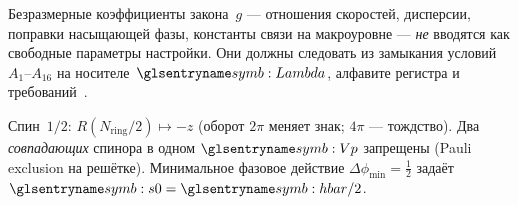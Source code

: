 \begin{axiom}
\label{ax:A15}
Безразмерные коэффициенты закона~$g$ --- отношения скоростей, дисперсии, поправки насыщающей фазы,
константы связи на макроуровне --- \emph{не} вводятся как свободные параметры настройки.
Они должны следовать из замыкания условий $A_1$--$A_{16}$ на носителе~$\carrierLattice$,
алфавите регистра и требований~.
\end{axiom}

\begin{axiom}
\label{ax:A16}
Спин~$1/2$: $R(N_{\mathrm{ring}}/2)\mapsto -z$ (оборот $2\pi$ меняет знак; $4\pi$ --- тождство).
Два \emph{совпадающих} спинора в одном $\PlanckCell$ запрещены (Pauli exclusion на решётке).
Минимальное фазовое действие $\Delta\phi_{\min}=\tfrac12$ задаёт $\ladderAction=\planckHbar/2$.
\end{axiom}

